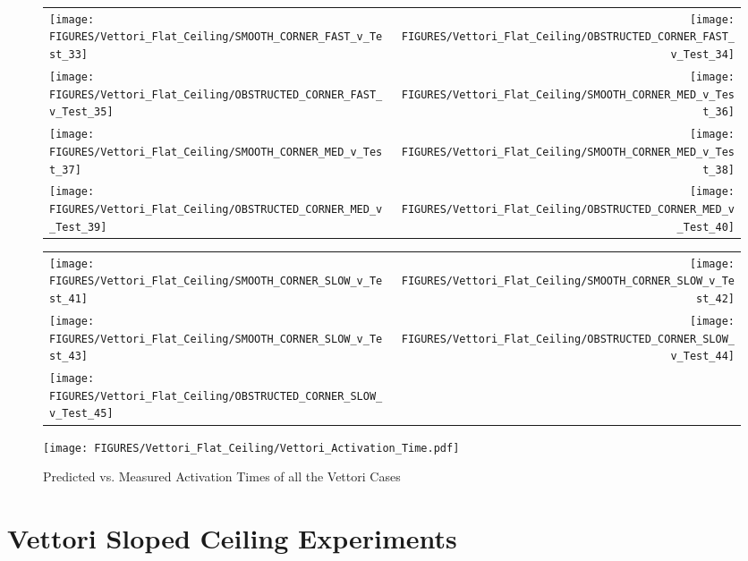 \begin{figure}[p]
\begin{tabular*}{\textwidth}{l@{\extracolsep{\fill}}r}
\texttt{[image: FIGURES/Vettori\_Flat\_Ceiling/SMOOTH\_CORNER\_FAST\_v\_Test\_33]} &
\texttt{[image: FIGURES/Vettori\_Flat\_Ceiling/OBSTRUCTED\_CORNER\_FAST\_v\_Test\_34]} \\
\texttt{[image: FIGURES/Vettori\_Flat\_Ceiling/OBSTRUCTED\_CORNER\_FAST\_v\_Test\_35]} &
\texttt{[image: FIGURES/Vettori\_Flat\_Ceiling/SMOOTH\_CORNER\_MED\_v\_Test\_36]} \\
\texttt{[image: FIGURES/Vettori\_Flat\_Ceiling/SMOOTH\_CORNER\_MED\_v\_Test\_37]} &
\texttt{[image: FIGURES/Vettori\_Flat\_Ceiling/SMOOTH\_CORNER\_MED\_v\_Test\_38]} \\
\texttt{[image: FIGURES/Vettori\_Flat\_Ceiling/OBSTRUCTED\_CORNER\_MED\_v\_Test\_39]} &
\texttt{[image: FIGURES/Vettori\_Flat\_Ceiling/OBSTRUCTED\_CORNER\_MED\_v\_Test\_40]} \\
\end{tabular*}
\label{Vettori_5}
\end{figure}

\begin{figure}[p]
\begin{tabular*}{\textwidth}{l@{\extracolsep{\fill}}r}
\texttt{[image: FIGURES/Vettori\_Flat\_Ceiling/SMOOTH\_CORNER\_SLOW\_v\_Test\_41]} &
\texttt{[image: FIGURES/Vettori\_Flat\_Ceiling/SMOOTH\_CORNER\_SLOW\_v\_Test\_42]} \\
\texttt{[image: FIGURES/Vettori\_Flat\_Ceiling/SMOOTH\_CORNER\_SLOW\_v\_Test\_43]} &
\texttt{[image: FIGURES/Vettori\_Flat\_Ceiling/OBSTRUCTED\_CORNER\_SLOW\_v\_Test\_44]} \\
\texttt{[image: FIGURES/Vettori\_Flat\_Ceiling/OBSTRUCTED\_CORNER\_SLOW\_v\_Test\_45]} \\
\end{tabular*}
\label{Vettori_5}
\end{figure}

\begin{figure}[p]
\begin{center}
\texttt{[image: FIGURES/Vettori\_Flat\_Ceiling/Vettori\_Activation\_Time.pdf]}
\end{center}
\caption{Predicted vs. Measured Activation Times of all the Vettori Cases}
\label{Vettori_Activation}
\end{figure}



\clearpage

\section{Vettori Sloped Ceiling Experiments}
\label{Vettori_Sloped_Results}


